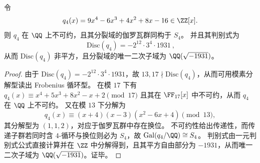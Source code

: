 \begin{proposition}\label{prop:fold-gauge-anomaly-trigonal-q4-galois}
令
\[
q_4(x)=9x^4-6x^3+4x^2+8x-16\in\ZZ[x].
\]
则 \(q_4\) 在 \(\QQ\) 上不可约，且其分裂域的伽罗瓦群同构于 \(S_4\)。
并且其判别式为
\[
\boxed{\ \mathrm{Disc}(q_4)=-2^{12}\cdot 3^{4}\cdot 1931\ },
\]
从而 \(\mathrm{Disc}(q_4)\) 非平方，且分裂域的唯一二次子域为 \(\QQ(\sqrt{-1931})\)。
\end{proposition}
\begin{proof}
由于 \(\mathrm{Disc}(q_4)=-2^{12}\cdot 3^{4}\cdot 1931\)，故 \(13,17\nmid \mathrm{Disc}(q_4)\)，从而可用模素分解型读出 Frobenius 循环型。
在模 \(17\) 下有
\(
q_4(x)\equiv x^4+5x^3+8x^2-x+2
\pmod{17}
\)
且其在 \(\FF_{17}[x]\) 中不可约，从而 \(q_4\) 在 \(\QQ\) 上不可约。
又在模 \(13\) 下分解为
\[
q_4(x)\equiv (x+4)(x-3)(x^2-6x+4)\pmod{13},
\]
其分解型为 \((1,1,2)\)，对应于伽罗瓦群中存在换位。
不可约性给出传递性，而传递子群若同时含 \(4\)-循环与换位则必为 \(S_4\)，故 \(\mathrm{Gal}(q_4/\QQ)\cong S_4\)。
判别式由一元判别式公式直接计算并在 \(\ZZ\) 中分解得到，且其平方自由部分为 \(-1931\)，从而唯一二次子域为 \(\QQ(\sqrt{-1931})\)。证毕。
\end{proof}

